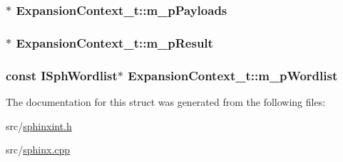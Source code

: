\hypertarget{structExpansionContext__t_aeb2431271f504076c4f20ffcb1f7e5e1}{
\subsubsection[{m\-\_\-p\-Payloads}]{$\ast$ Expansion\-Context\-\_\-t\-::m\-\_\-p\-Payloads}}\label{structExpansionContext__t_aeb2431271f504076c4f20ffcb1f7e5e1}
\hypertarget{structExpansionContext__t_aa81ebe53d13c706ee646ee0a042189e2}{
\subsubsection[{m\-\_\-p\-Result}]{$\ast$ Expansion\-Context\-\_\-t\-::m\-\_\-p\-Result}}\label{structExpansionContext__t_aa81ebe53d13c706ee646ee0a042189e2}
\hypertarget{structExpansionContext__t_a4929d0871e2ff2d3c7e86d8361bf7d34}{
\subsubsection[{m\-\_\-p\-Wordlist}]{\setlength{\rightskip}{0pt plus 5cm}const {\bf I\-Sph\-Wordlist}$\ast$ Expansion\-Context\-\_\-t\-::m\-\_\-p\-Wordlist}}\label{structExpansionContext__t_a4929d0871e2ff2d3c7e86d8361bf7d34}


The documentation for this struct was generated from the following files\-:\begin{DoxyCompactItemize}
\item 
src/\hyperlink{sphinxint_8h}{sphinxint.\-h}\item 
src/\hyperlink{sphinx_8cpp}{sphinx.\-cpp}\end{DoxyCompactItemize}
